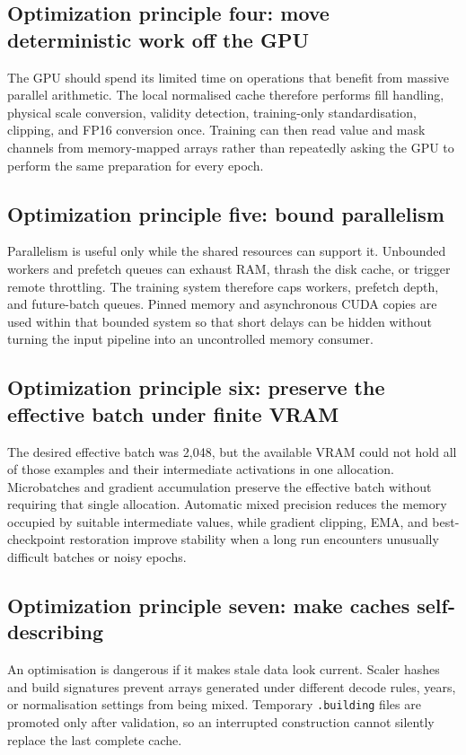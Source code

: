 \documentclass[12pt,a4paper]{report}
\begin{document}
\subsection{Optimization principle four: move deterministic work off the GPU}
The GPU should spend its limited time on operations that benefit from massive
parallel arithmetic. The local normalised cache therefore performs fill
handling, physical scale conversion, validity detection, training-only
standardisation, clipping, and FP16 conversion once. Training can then read
value and mask channels from memory-mapped arrays rather than repeatedly asking
the GPU to perform the same preparation for every epoch.

\subsection{Optimization principle five: bound parallelism}
Parallelism is useful only while the shared resources can support it. Unbounded
workers and prefetch queues can exhaust RAM, thrash the disk cache, or trigger
remote throttling. The training system therefore caps workers, prefetch depth,
and future-batch queues. Pinned memory and asynchronous CUDA copies are used
within that bounded system so that short delays can be hidden without turning
the input pipeline into an uncontrolled memory consumer.

\subsection{Optimization principle six: preserve the effective batch under finite VRAM}
The desired effective batch was 2,048, but the available VRAM could not hold all
of those examples and their intermediate activations in one allocation.
Microbatches and gradient accumulation preserve the effective batch without
requiring that single allocation. Automatic mixed precision reduces the memory
occupied by suitable intermediate values, while gradient clipping, EMA, and
best-checkpoint restoration improve stability when a long run encounters
unusually difficult batches or noisy epochs.

\subsection{Optimization principle seven: make caches self-describing}
An optimisation is dangerous if it makes stale data look current. Scaler hashes
and build signatures prevent arrays generated under different decode rules,
years, or normalisation settings from being mixed. Temporary
\texttt{.building} files are promoted only after validation, so an interrupted
construction cannot silently replace the last complete cache.
\end{document}
